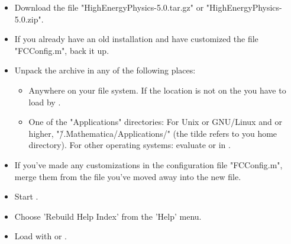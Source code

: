 \begin{itemize}

\item{Download the file "HighEnergyPhysics-5.0.tar.gz" or "HighEnergyPhysics-5.0.zip".}

\item{If you already have an old installation and have customized the file "FCConfig.m", back it up.}

\item{Unpack the archive in any of the following places:

\begin{itemize}

\item{Anywhere on your file system. If the location is not on the \mma {} you
have to load \fc by .} 

\item{One of the \mma "Applications" directories: For {\sc Unix} or {\sc GNU/Linux} and
 or higher, "\~/.Mathematica/Applications/" (the tilde refers to you home directory).
For other operating systems: evaluate  or  in \mma.}
\end{itemize}
}

\item{If you've made any customizations in the configuration file "FCConfig.m", merge them from the file you've moved away into the new file.}

\item{Start \mma.}

\item{Choose 'Rebuild Help Index' from the 'Help' menu.}

\item{Load \fc with  or .}

\end{itemize}



